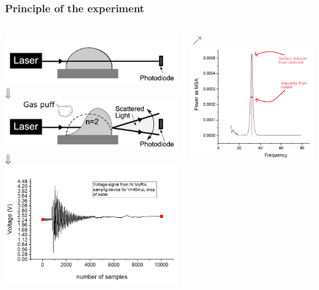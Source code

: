 \documentclass[xcolor=table]{beamer}
\begin{document}
\begin{frame}
\frametitle{Principle of the experiment} 
\fontsize{11}{12.2} \selectfont
\begin{columns}
	\begin{column}{.5\textwidth}
		\centering
		\includegraphics[width=0.8\columnwidth]{introduzione1.PNG}\\
		$\big\Downarrow$\\
		\includegraphics[width=0.8\columnwidth]{introduzione.PNG}\\
		$\big\Downarrow$\centering\\
		\includegraphics[width=0.8\columnwidth]{voltagesignal.PNG}\\
	\end{column}
	\begin{column}{.7\textwidth}
		$\nearrow$ \includegraphics[width=0.7\columnwidth]{picco_f_fwhm.png}\\
		

\end{column}
\end{columns}
\end{frame}
\end{document}
